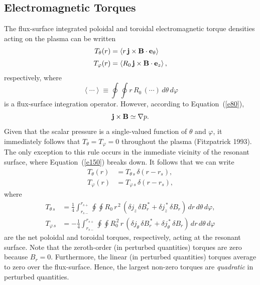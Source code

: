 \documentclass[notitlepage,12pt]{article}
\begin{document}
\subsection{Electromagnetic Torques}\label{storque}
The flux-surface integrated poloidal and toroidal electromagnetic torque densities acting on the plasma
can be written
\begin{align}\label{e152}
T_\theta(r) &= \left\langle r\,{\bf j}\times {\bf B}\cdot {\bf e}_\theta\right\rangle\\[0.5ex]
T_\varphi(r) &= \left\langle R_0\,{\bf j}\times {\bf B}\cdot {\bf e}_z\right\rangle,
\end{align}
respectively, 
where
\begin{equation}
\left\langle\cdots\right\rangle \equiv \oint\oint r\,R_0\,(\cdots)\,d\theta\,d\varphi
\end{equation}
is a flux-surface integration  operator. 
 However, according to Equation~(\ref{e80}),
\begin{equation}\label{e150}
{\bf j}\times {\bf B} \simeq \nabla p.
\end{equation}
Given that the scalar pressure is a single-valued function of $\theta$ and $\varphi$, it immediately follows
that $T_\theta=T_\varphi = 0$ throughout the plasma (Fitzpatrick 1993). The only exception to this rule occurs in the immediate vicinity of the
resonant surface, where Equation~(\ref{e150}) breaks down. It follows that we can write
\begin{align}\label{e156a}
T_\theta(r) &= T_{\theta\,s}\,\delta(r-r_s),\\[0.5ex]
T_\varphi(r) &= T_{\varphi\,s}\,\delta(r-r_s),
\end{align}
where
\begin{align}\label{e153}
T_{\theta\,s} &=  \frac{1}{4}\int_{r_{s-}}^{r_{s+}}\oint\oint R_0\,r^{\,2}\,(\delta j_z\,\delta B_r^{\,\ast} + \delta j_z^{\,\ast}\,\delta B_r)\,dr\,d\theta\,d\varphi,\\[0.5ex]
T_{\varphi\,s} &=  -\frac{1}{4}\int_{r_{s-}}^{r_{s+}}\oint\oint R_0^{\,2}\,r\,(\delta j_\theta\,\delta B_r^{\,\ast} + \delta j_\theta^{\,\ast}\,\delta B_r)\,dr\,d\theta\,d\varphi
\end{align}
are the net poloidal and toroidal torques, respectively, acting at the resonant surface. 
Note that the zeroth-order (in perturbed quantities) torques are zero because $B_r=0$. Furthermore, the linear (in perturbed quantities) torques 
average to zero over the flux-surface. Hence, the largest non-zero torques  are {\em quadratic}\/ in perturbed quantities. 
\end{document}
